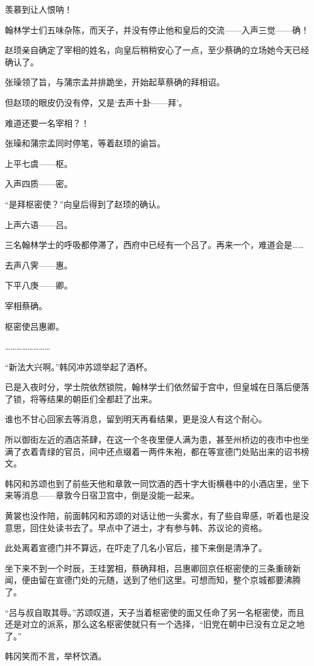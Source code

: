羡慕到让人恨呐！

翰林学士们五味杂陈，而天子，并没有停止他和皇后的交流——入声三觉——确！

赵顼亲自确定了宰相的姓名，向皇后稍稍安心了一点，至少蔡确的立场她今天已经确认了。

张璪领了旨，与蒲宗孟并排跪坐，开始起草蔡确的拜相诏。

但赵顼的眼皮仍没有停，又是‘去声十卦——拜’。

难道还要一名宰相？！

张璪和蒲宗孟同时停笔，等着赵顼的谕旨。

上平七虞——枢。

入声四质——密。

“是拜枢密使？”向皇后得到了赵顼的确认。

上声六语——吕。

三名翰林学士的呼吸都停滞了，西府中已经有一个吕了。再来一个，难道会是……

去声八霁——惠。

下平八庚——卿。

宰相蔡确。

枢密使吕惠卿。

……………………

“新法大兴啊。”韩冈冲苏颂举起了酒杯。

已是入夜时分，学士院依然锁院，翰林学士们依然留于宫中，但皇城在日落后便落了锁，将等结果的朝臣们全都赶了出来。

谁也不甘心回家去等消息，留到明天再看结果，更是没人有这个耐心。

所以御街左近的酒店茶肆，在这一个冬夜里便人满为患，甚至州桥边的夜市中也坐满了衣着青绿的官员，间中还点缀着一两件朱袍，都在等宣德门处贴出来的诏书榜文。

韩冈和苏颂也到了前些天他和章敦一同饮酒的西十字大街横巷中的小酒店里，坐下来等消息——章敦今日宿卫宫中，倒是没能一起来。

黄裳也没作陪，前面韩冈和苏颂的对话让他一头雾水，有了些自卑感，听着也是没意思，回住处读书去了。早点中了进士，才有参与韩、苏议论的资格。

此处离着宣德门并不算远，在吓走了几名小官后，接下来倒是清净了。

坐下来不到一个时辰，王珪罢相，蔡确拜相，吕惠卿回京任枢密使的三条重磅新闻，便由留在宣德门处的元随，送到了他们这里。可想而知，整个京城都要沸腾了。

“吕与叔自取其辱。”苏颂叹道，天子当着枢密使的面又任命了另一名枢密使，而且还是对立的派系，那么这名枢密使就只有一个选择，“旧党在朝中已没有立足之地了。”

韩冈笑而不言，举杯饮酒。

